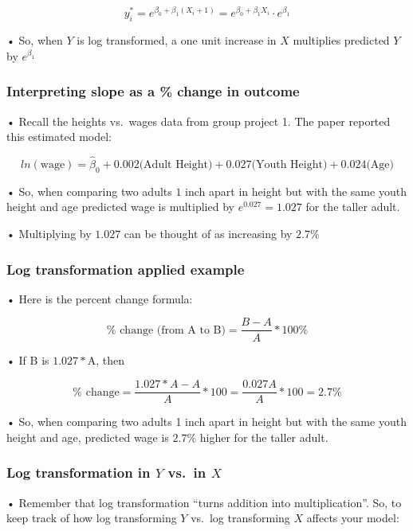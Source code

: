 \documentclass[
  letterpaper,
  DIV=11,
  numbers=noendperiod]{scrreprt}
\begin{document}
\[
y_i^* = e^{\beta_0 + \beta_1(X_i + 1)} = e^{\beta_0 + \beta_1X_i} \cdot e^{\beta_1}
\]

• So, when \(Y\) is log transformed, a one unit increase in \(X\)
multiplies predicted \(Y\) by \(e^{\beta_1}\)

\hypertarget{interpreting-slope-as-a-change-in-outcome}{%
\subsubsection{Interpreting slope as a \% change in
outcome}\label{interpreting-slope-as-a-change-in-outcome}}

• Recall the heights vs.~wages data from group project 1. The paper
reported this estimated model:

\[
ln(\text{wage}) = \hat{\beta}_0 + 0.002\text{(Adult Height)} + 0.027\text{(Youth Height)} + 0.024\text{(Age)}
\]

• So, when comparing two adults \(1\) inch apart in height but with the
same youth height and age predicted wage is multiplied by
\(e^{0.027} = 1.027\) for the taller adult.

• Multiplying by \(1.027\) can be thought of as increasing by \(2.7\%\)

\hypertarget{log-transformation-applied-example}{%
\subsubsection{Log transformation applied
example}\label{log-transformation-applied-example}}

• Here is the percent change formula:

\[
\%\text{ change (from A to B)} = \frac{B-A}{A}*100\%
\]

• If B is \(1.027*\)A, then

\[
\%\text{ change} = \frac{1.027*A - A}{A}*100 = \frac{0.027A}{A}*100 = 2.7\%
\]

• So, when comparing two adults 1 inch apart in height but with the same
youth height and age, predicted wage is \(2.7\%\) higher for the taller
adult.

\hypertarget{log-transformation-in-y-vs.-in-x}{%
\subsubsection{\texorpdfstring{Log transformation in \(Y\) vs.~in
\(X\)}{Log transformation in Y vs.~in X}}\label{log-transformation-in-y-vs.-in-x}}

• Remember that log transformation ``turns addition into
multiplication''. So, to keep track of how log transforming \(Y\)
vs.~log transforming \(X\) affects your model:
\end{document}
